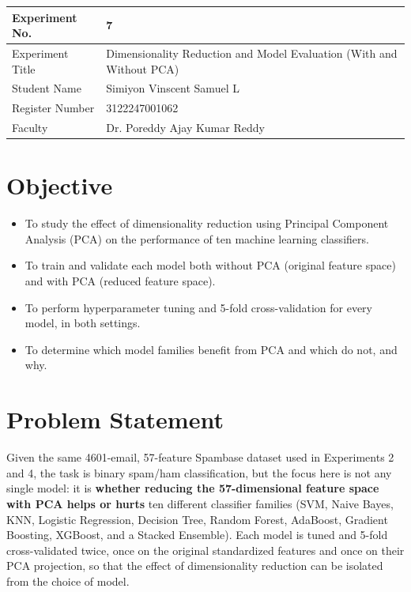 \documentclass[12pt,a4paper]{article}
\begin{document}
\begin{tabular}{|p{4cm}|p{11cm}|}
\hline
Experiment No. & 7 \\ \hline
Experiment Title & Dimensionality Reduction and Model Evaluation (With and Without
PCA)\footnotemark\\ \hline
Student Name & Simiyon Vinscent Samuel L \\ \hline
Register Number & 3122247001062 \\ \hline
Faculty & Dr. Poreddy Ajay Kumar Reddy \\ \hline
\end{tabular}

\section{Objective}
\begin{itemize}[nosep]
\item To study the effect of dimensionality reduction using Principal Component Analysis
(PCA) on the performance of ten machine learning classifiers.
\item To train and validate each model both without PCA (original feature space) and with
PCA (reduced feature space).
\item To perform hyperparameter tuning and 5-fold cross-validation for every model, in both
settings.
\item To determine which model families benefit from PCA and which do not, and why.
\end{itemize}

\section{Problem Statement}
Given the same 4601-email, 57-feature Spambase dataset used in Experiments 2 and 4, the task
is binary spam/ham classification, but the focus here is not any single model: it is
\textbf{whether reducing the 57-dimensional feature space with PCA helps or hurts} ten
different classifier families (SVM, Naive Bayes, KNN, Logistic Regression, Decision Tree,
Random Forest, AdaBoost, Gradient Boosting, XGBoost, and a Stacked Ensemble). Each model is
tuned and 5-fold cross-validated twice, once on the original standardized features and once
on their PCA projection, so that the effect of dimensionality reduction can be isolated from
the choice of model.
\end{document}
